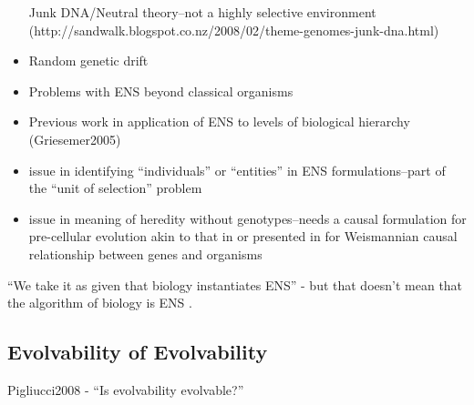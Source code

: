 \begin{itemize}
	      Junk DNA/Neutral theory--not a highly selective environment
	      (http://sandwalk.blogspot.co.nz/2008/02/theme-genomes-junk-dna.html)
	\item
	      Random genetic drift
	\item
	      Problems with ENS beyond classical organisms
	\item
	      Previous work in application of ENS to levels of biological hierarchy
	      (Griesemer2005)
	\item
	      issue in identifying ``individuals'' or ``entities'' in ENS
	      formulations--part of the ``unit of selection'' problem
	\item
	      issue in meaning of heredity without genotypes--needs a causal
	      formulation for pre-cellular evolution akin to that in
	      \autocite{Bourrat2015} or presented in \autocite{Griesemer2005} for
	      Weismannian causal relationship between genes and organisms
\end{itemize}

``We take it as given that biology instantiates ENS'' - but that doesn't mean that the algorithm of biology is ENS \autocite{Watson2012}.

\subsection{Evolvability of Evolvability}

Pigliucci2008 - ``Is evolvability evolvable?''

